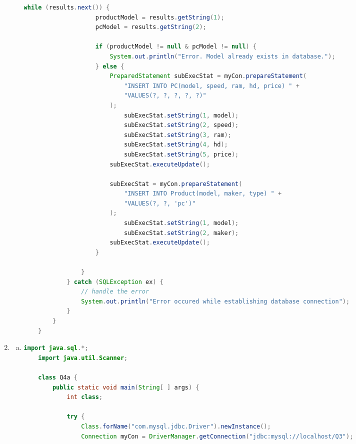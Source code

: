 \documentclass[12pt]{article}
\begin{document}
\begin{enumerate}[1.]
\begin{enumerate}[a)]
\begin{lstlisting}[language=JAVA]
                while (results.next()) {
                    productModel = results.getString(1);
                    pcModel = results.getString(2);

                    if (productModel != null & pcModel != null) {
                        System.out.println("Error. Model already exists in database.");
                    } else {
                        PreparedStatement subExecStat = myCon.prepareStatement(
                            "INSERT INTO PC(model, speed, ram, hd, price) " +
                            "VALUES(?, ?, ?, ?, ?)"
                        );
                            subExecStat.setString(1, model);
                            subExecStat.setString(2, speed);
                            subExecStat.setString(3, ram);
                            subExecStat.setString(4, hd);
                            subExecStat.setString(5, price);
                        subExecStat.executeUpdate();

                        subExecStat = myCon.prepareStatement(
                            "INSERT INTO Product(model, maker, type) " +
                            "VALUES(?, ?, 'pc')"
                        );
                            subExecStat.setString(1, model);
                            subExecStat.setString(2, maker);
                        subExecStat.executeUpdate();
                    }

                }
            } catch (SQLException ex) {
                // handle the error
                System.out.println("Error occured while establishing database connection");
            }
        }
    }
    \end{lstlisting}

    \end{enumerate}

    \item

    \begin{enumerate}[a)]
        \item

    \begin{lstlisting}[language=JAVA]
    import java.sql.*;
    import java.util.Scanner;

    class Q4a {
        public static void main(String[ ] args) {
            int class;

            try {
                Class.forName("com.mysql.jdbc.Driver").newInstance();
                Connection myCon = DriverManager.getConnection("jdbc:mysql://localhost/Q3");


\end{lstlisting}
\end{enumerate}
\end{enumerate}
\end{document}
